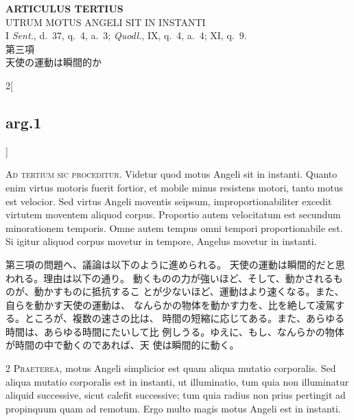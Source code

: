 \documentclass[paper=a4paper,fontsize=10pt,jafontsize=9pt,titlepage]{jlreq}
\begin{document}
\newpage
{}
{}
\setcounter{section}{3}
\setcounter{subsection}{0}








\begin{center}
 {\Large {\bfseries ARTICULUS TERTIUS}}\\
 {\large UTRUM MOTUS ANGELI SIT IN INSTANTI}\\
 {\footnotesize I {\itshape Sent.}, d.~37, q.~4, a.~3; {\itshape
 Quodl.}, IX, q.~4, a.~4; XI, q.~9.}\\
 {\Large 第三項\\天使の運動は瞬間的か}
\end{center}

\begin{paracol}{2}[\subsection{arg.1}]

{\huge A}{\scshape d tertium sic proceditur}. Videtur quod
motus Angeli sit in instanti. Quanto enim virtus motoris fuerit fortior,
et mobile minus resistens motori, tanto motus est velocior. Sed virtus
Angeli moventis seipsum, improportionabiliter excedit virtutem moventem
aliquod corpus. Proportio autem velocitatum est secundum minorationem
temporis. Omne autem tempus omni tempori proportionabile est. Si igitur
aliquod corpus movetur in tempore, Angelus movetur in instanti.

\switchcolumn

第三項の問題へ、議論は以下のように進められる。
天使の運動は瞬間的だと思われる。理由は以下の通り。
動くものの力が強いほど、そして、動かされるものが、動かすものに抵抗するこ
 とが少ないほど、運動はより速くなる。また、自らを動かす天使の運動は、
 なんらかの物体を動かす力を、比を絶して凌駕する。ところが、複数の速さの比は、
 時間の短縮に応じてある。また、あらゆる時間は、あらゆる時間にたいして比
 例しうる。ゆえに、もし、なんらかの物体が時間の中で動くのであれば、天
 使は瞬間的に動く。


{\scshape 2 Praeterea}, motus Angeli simplicior est quam
aliqua mutatio corporalis. Sed aliqua mutatio corporalis est in
instanti, ut illuminatio, tum quia non illuminatur aliquid successive,
sicut calefit successive; tum quia radius non prius pertingit ad
propinquum quam ad remotum. Ergo multo magis motus Angeli est in
instanti.


\end{paracol}
\end{document}
